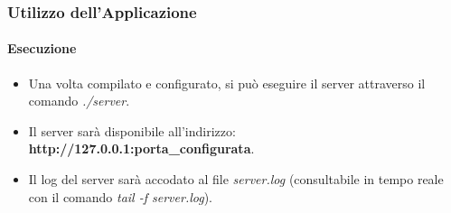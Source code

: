 \documentclass{beamer}
\begin{document}
\begin{frame}
\frametitle{Utilizzo dell'Applicazione}
\framesubtitle{Esecuzione}

\begin{itemize}
\item Una volta compilato e configurato, si può eseguire il server attraverso il comando \textit{./server}.
\item Il server sarà  disponibile all’indirizzo: \textbf{http://127.0.0.1:porta\_configurata}.
\item Il log del server sarà accodato al file \textit{server.log} (consultabile in tempo reale con il
comando \textit{tail -f server.log}).
\end{itemize}


\end{frame}
\end{document}
